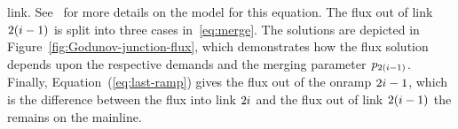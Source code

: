 			link. See~\cite{Monache2013} for more details on the model for this
			equation. The flux out of link $2(i-1)$ is split into three cases
			in~\eqref{eq:merge}. The solutions are depicted in Figure~\ref{fig:Godunov-junction-flux},
			which demonstrates how the flux solution depends upon the respective
			demands and the merging parameter $p_{2\left(\link-1\right)}$. Finally,
			Equation~(\eqref{eq:last-ramp}) gives the flux out of the onramp $2i-1$,
			which is the difference between the flux into link $2i$ and the
			flux out of link $2\left(\link-1\right)$ the remains on the mainline.
			\begin{figure}
				\hfill{}\hfill{}
								

\end{figure}
